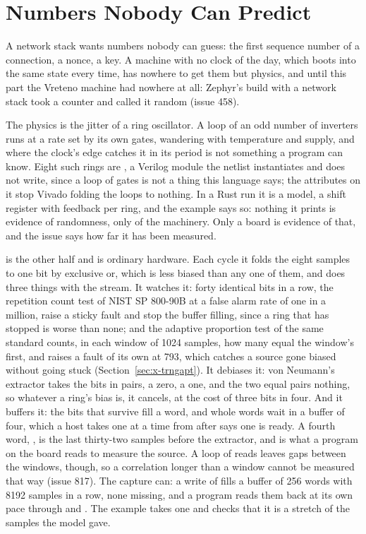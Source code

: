 \section{Numbers Nobody Can Predict}
\label{sec:x-trng}

A network stack wants numbers nobody can guess: the first sequence
number of a connection, a nonce, a key. A machine with no clock of the
day, which boots into the same state every time, has nowhere to get
them but physics, and until this part the Vreteno machine had nowhere
at all: Zephyr's build with a network stack took a counter and called
it random (issue 458).

The physics is the jitter of a ring oscillator. A loop of an odd
number of inverters runs at a rate set by its own gates, wandering
with temperature and supply, and where the clock's edge catches it in
its period is not something a program can know. Eight such rings are
, a Verilog module the netlist instantiates and does not
write, since a loop of gates is not a thing this language says; the
attributes on it stop Vivado folding the loops to nothing. In a Rust
run it is a model, a shift register with feedback per ring, and the
example says so: nothing it prints is evidence of randomness, only of
the machinery. Only a board is evidence of that, and the issue says
how far it has been measured.

 is the other half and is ordinary hardware. Each cycle it
folds the eight samples to one bit by exclusive or, which is less
biased than any one of them, and does three things with the stream.
It watches it: forty identical bits in a row, the repetition count
test of NIST SP 800-90B at a false alarm rate of one in a million,
raise a sticky fault and stop the buffer filling, since a ring that
has stopped is worse than none; and the adaptive proportion test of
the same standard counts, in each window of 1024 samples, how many
equal the window's first, and raises a fault of its own at 793, which
catches a source gone biased without going stuck
(Section~\ref{sec:x-trngapt}). It debiases it: von Neumann's
extractor takes the bits in pairs,  a zero,  a one,
and the two equal pairs nothing, so whatever a ring's bias is, it
cancels, at the cost of three bits in four. And it buffers it: the
bits that survive fill a word, and whole words wait in a buffer of
four, which a host takes one at a time from  after
 says one is ready. A fourth word, , is the
last thirty-two samples before the extractor, and is what a program
on the board reads to measure the source.
A loop of reads leaves gaps between the windows, though, so a
correlation longer than a window cannot be measured that way (issue
817). The capture can: a write of  fills a buffer of 256
words with 8192 samples in a row, none missing, and a program reads
them back at its own pace through  and
. The example takes one and checks that it is a
stretch of the samples the model gave.

